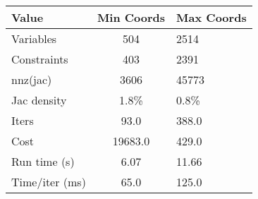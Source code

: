 \begin{tabular}{lcl}
\toprule 
Value & Min Coords & Max Coords \\
\midrule 
Variables & 504 & 2514 \\
Constraints & 403 & 2391 \\
nnz(jac) & 3606 & 45773 \\
Jac density & 1.8\% & 0.8\% \\
Iters & 93.0 & 388.0 \\
Cost & 19683.0 & 429.0 \\
Run time (s) & 6.07 & 11.66 \\
Time/iter (ms) & 65.0 & 125.0 \\
\bottomrule 
\end{tabular}
